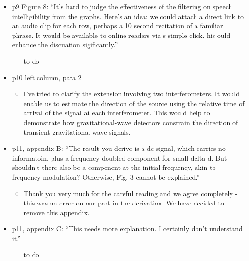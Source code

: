 \documentclass[a4paper, 10pt]{letter}
\begin{document}
\begin{itemize}
\item p9 Figure 8: ``It's hard to judge the effectiveness of the filtering on speech intelligibility from the graphs. Here's an idea: we could attach a direct link to an audio clip for each row, perhaps a 10 second recitation of a familiar phrase. It would be available to online readers via s simple click. his ould enhance the discuation sigificantly.''
\begin{itemize}
\item [to do ]
\end{itemize}

\item p10 left column, para 2
\begin{itemize}
\item I've tried to clarify the extension involving two interferometers. It would enable us to estimate the direction of the source using the relative time of arrival of the signal at each interferometer. This would help to demonstrate how gravitational-wave detectors constrain the direction of transient gravitational wave signals. 
\end{itemize}

\item p11, appendix B: ``The result you derive is a dc signal, which carries no informatoin, plus a frequency-doubled component for small delta-d. But shouldn't there also be a component at the initial frequency, akin to frequency modulation? Otherwise, Fig. 3 cannot be explained.''
\begin{itemize}
\item Thank you very much for the careful reading and we agree completely - this was an error on our part in the derivation. We have decided to remove this appendix. 
\end{itemize}

\item p11, appendix C: ``This needs more explanation. I certainly don't understand it.''
\begin{itemize}
\item [to do]
\end{itemize}

\end{itemize}
\end{document}
